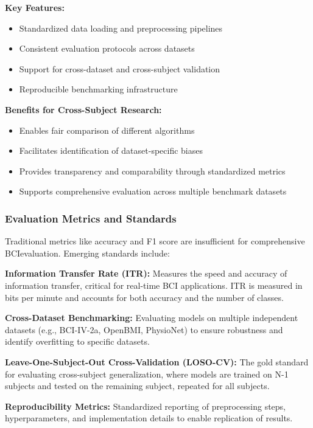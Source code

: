 \documentclass[12pt]{article}
\begin{document}
\textbf{Key Features:}
\begin{itemize}
    \item Standardized data loading and preprocessing pipelines
    \item Consistent evaluation protocols across datasets
    \item Support for cross-dataset and cross-subject validation
    \item Reproducible benchmarking infrastructure
\end{itemize}

\textbf{Benefits for Cross-Subject Research:}
\begin{itemize}
    \item Enables fair comparison of different algorithms
    \item Facilitates identification of dataset-specific biases
    \item Provides transparency and comparability through standardized metrics
    \item Supports comprehensive evaluation across multiple benchmark datasets
\end{itemize}

\subsubsection{Evaluation Metrics and Standards}

Traditional metrics like accuracy and F1 score are insufficient for comprehensive BCIevaluation. Emerging standards include:

\textbf{Information Transfer Rate (ITR):} Measures the speed and accuracy of information transfer, critical for real-time BCI applications. ITR is measured in bits per minute and accounts for both accuracy and the number of classes.

\textbf{Cross-Dataset Benchmarking:} Evaluating models on multiple independent datasets (e.g., BCI-IV-2a, OpenBMI, PhysioNet) to ensure robustness and identify overfitting to specific datasets.

\textbf{Leave-One-Subject-Out Cross-Validation (LOSO-CV):} The gold standard for evaluating cross-subject generalization, where models are trained on N-1 subjects and tested on the remaining subject, repeated for all subjects.

\textbf{Reproducibility Metrics:} Standardized reporting of preprocessing steps, hyperparameters, and implementation details to enable replication of results.
\end{document}
